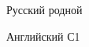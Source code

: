 
\begin{cvskills}

  \cvskill
    {Русский} %
    {родной} %

  \cvskill
    {Английский} %
    {С1} %
    
\end{cvskills}
